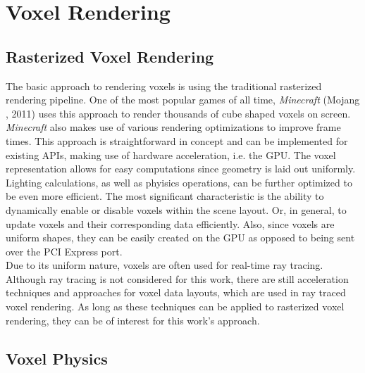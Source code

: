 \section{Voxel Rendering} \label{sec-voxel-rendering}

\subsection*{Rasterized Voxel Rendering} \label{subsec-rasterized-voxel-rendering}

The basic approach to rendering voxels is using the traditional rasterized rendering pipeline.
One of the most popular games of all time, \emph{Minecraft} (Mojang \cite{Mojang2024}, 2011) uses 
this approach to render thousands of cube shaped voxels on screen. \emph{Minecraft} also makes use 
of various rendering optimizations to improve frame times. This approach is straightforward in 
concept and can be implemented for existing \ac{API}s, making use of hardware acceleration, i.e. 
the \ac{GPU}. The voxel representation allows for easy computations since geometry is laid out 
uniformly. Lighting calculations, as well as phyisics operations, can be further optimized to 
be even more efficient. The most significant characteristic is the ability to dynamically enable or 
disable voxels within the scene layout. Or, in general, to update voxels and their corresponding 
data efficiently. Also, since voxels are uniform shapes, they can be easily created on the \ac{GPU} 
as opposed to being sent over the \ac{PCI Express} port. \\

\noindent
Due to its uniform nature, voxels are often used for real-time ray tracing. Although ray tracing 
is not considered for this work, there are still acceleration techniques and approaches for voxel 
data layouts, which are used in ray traced voxel rendering. As long as these techniques can be 
applied to rasterized voxel rendering, they can be of interest for this work's approach.


\subsection*{Voxel Physics} \label{subsec-voxel-physics}

